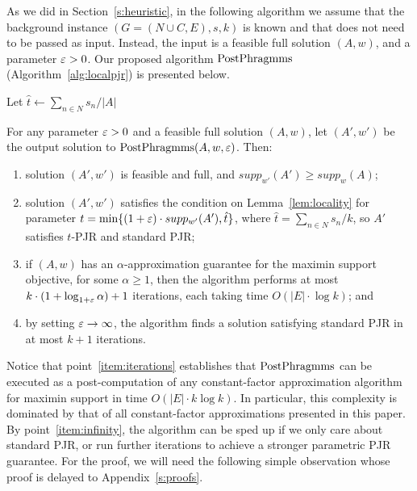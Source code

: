 As we did in Section~\ref{s:heuristic}, in the following algorithm we assume that the background instance $(G=(N\cup C, E), s, k)$ is known and that does not need to be passed as input. 
Instead, the input is a feasible full solution $(A,w)$, and a parameter $\varepsilon>0$. 
Our proposed algorithm $\operatorname{PostPhragmms}$ (Algorithm~\ref{alg:localpjr}) is presented below. 

\begin{algorithm}[htb]\label{alg:localpjr}
\SetAlgoLined
{}

Let $\hat{t}\leftarrow \sum_{n\in N} s_n / |A|$\;
\caption{$\LSPJR(A,w,\eps)$}
\end{algorithm}

\begin{theorem}\label{thm:enabler}
For any parameter $\varepsilon>0$ and a feasible full solution $(A,w)$, let $(A',w')$ be the output solution to $\LSPJR(A,w,\eps)$. Then: 
\begin{enumerate}
    \item solution $(A',w')$ is feasible and full, and $supp_{w'}(A')\geq supp_w(A)$; \label{item:support}
    \item solution $(A', w')$ satisfies the condition on Lemma~\ref{lem:locality} for parameter $t=\min\{(1+\varepsilon)\cdot supp_{w'}(A'), \hat{t}\}$, where $\hat{t}=\sum_{n\in N} s_n / k$, so $A'$ satisfies $t$-PJR and standard PJR; 
		\label{item:tPJR}
		\item if $(A,w)$ has an $\alpha$-approximation guarantee for the maximin support objective, for some $\alpha\geq 1$, then the algorithm performs at most $k\cdot (1+\log_{1+\varepsilon} \alpha)+1$ iterations, each taking time $O(|E|\cdot \log k)$; and \label{item:iterations}
		\item by setting $\varepsilon\rightarrow\infty$, the algorithm finds a solution satisfying standard PJR in at most $k+1$ iterations. \label{item:infinity}

\end{enumerate}
\end{theorem}

Notice that point~\ref{item:iterations} establishes that $\operatorname{PostPhragmms}$ can be executed as a post-computation of any constant-factor approximation algorithm for maximin support in time $O(|E|\cdot k\log k)$. In particular, this complexity is dominated by that of all constant-factor approximations presented in this paper.
By point~\ref{item:infinity}, the algorithm can be sped up if we only care about standard PJR, or run further iterations to achieve a stronger parametric PJR guarantee. 
For the proof, we will need the following simple observation whose proof is delayed to Appendix~\ref{s:proofs}.


